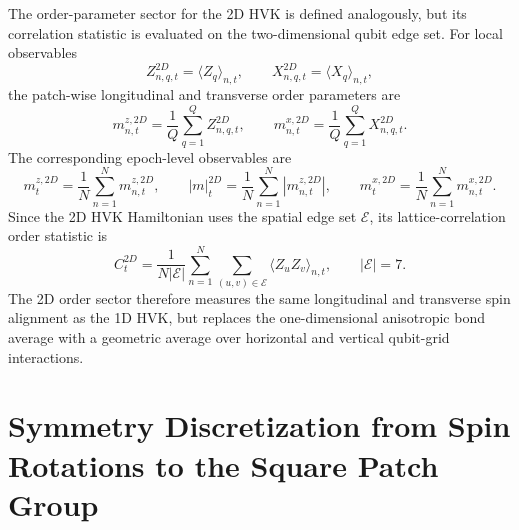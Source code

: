 \documentclass[11pt]{article}
\begin{document}
The order-parameter sector for the 2D HVK is defined analogously, but its correlation statistic is evaluated on the two-dimensional qubit edge set. For local observables
\begin{equation}
Z_{n,q,t}^{2D}=\langle Z_q\rangle_{n,t},
\qquad
X_{n,q,t}^{2D}=\langle X_q\rangle_{n,t},
\end{equation}
the patch-wise longitudinal and transverse order parameters are
\begin{equation}
m_{n,t}^{z,2D}
=
\frac{1}{Q}
\sum_{q=1}^{Q}Z_{n,q,t}^{2D},
\qquad
m_{n,t}^{x,2D}
=
\frac{1}{Q}
\sum_{q=1}^{Q}X_{n,q,t}^{2D}.
\end{equation}
The corresponding epoch-level observables are
\begin{equation}
m_t^{z,2D}
=
\frac{1}{N}\sum_{n=1}^{N}m_{n,t}^{z,2D},
\qquad
|m|_t^{2D}
=
\frac{1}{N}\sum_{n=1}^{N}\left|m_{n,t}^{z,2D}\right|,
\qquad
m_t^{x,2D}
=
\frac{1}{N}\sum_{n=1}^{N}m_{n,t}^{x,2D}.
\end{equation}
Since the 2D HVK Hamiltonian uses the spatial edge set $\mathcal{E}$, its lattice-correlation order statistic is
\begin{equation}
C_t^{2D}
=
\frac{1}{N|\mathcal{E}|}
\sum_{n=1}^{N}
\sum_{(u,v)\in\mathcal{E}}
\langle Z_uZ_v\rangle_{n,t},
\qquad
|\mathcal{E}|=7.
\end{equation}
The 2D order sector therefore measures the same longitudinal and transverse spin alignment as the 1D HVK, but replaces the one-dimensional anisotropic bond average with a geometric average over horizontal and vertical qubit-grid interactions.

\section{Symmetry Discretization from Spin Rotations to the Square Patch Group}
\end{document}
